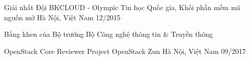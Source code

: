 
\begin{cvhonors}

  \cvhonor
    {Giải nhất} %
    {Đội BKCLOUD - Olympic Tin học Quốc gia, Khối phần mềm mã nguồn mở} %
    {Hà Nội, Việt Nam} %
    {12/2015} %

  \cvhonor
    {Bằng khen của Bộ trưởng Bộ Công nghệ thông tin \& Truyền thông} %
    {} %
    {} %
    {} %

  \cvhonor
    {OpenStack Core Reviewer} %
    {Project OpenStack Zun} %
    {Hà Nội, Việt Nam} %
    {09/2017} %

\end{cvhonors}
